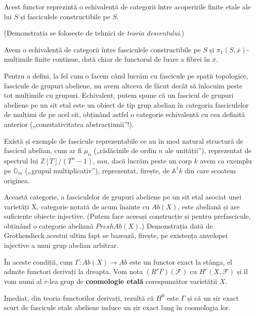 \documentclass[13pt,openany,oneside]{book}
\begin{document}
\begin{teo}
Acest functor reprezintă o echivalență de categorii între acoperirile finite etale ale lui $S$ și fasciculele constructibile pe $S$.
\end{teo}

(Demonstrația se folosește de tehnici de {\it teoria descentului}.)

\begin{cor}
Avem o echivalență de categorii între fasciculele constructibile pe $S$ și $\pi_1(S,\bar{x})$-mulțimile finite continue, dată chiar de functorul de luare a fibrei în $\bar{x}$.
\end{cor}

Pentru a defini, la fel cum o facem când lucrăm cu fascicule pe spații topologice, fascicule de grupuri abeliene, nu avem altceva de făcut decât să înlocuim peste tot mulțimile cu grupuri. Echivalent, putem spune că un fascicul de grupuri abeliene pe un sit etal este un obiect de tip grup abelian în categoria fasciculelor de mulțimi de pe acel sit, obținând astfel o categorie echivalentă cu cea definită anterior („comutativitatea abstracțiunii”!).

Există și exemple de fascicule reprezentabile ce au în mod natural structură de fascicul abelian, cum ar fi $\mu_n$ („rădăcinile de ordin $n$ ale unității”), reprezentat de spectrul lui $\mathbb{Z}[T]/(T^n-1)$, sau, dacă lucrăm peste un corp $k$ avem ca exemplu pe $\mathbb{G}_m$ („grupul multiplicativ”), reprezentat, firește, de $\mathbb{A}^1 k$ din care scoatem originea.

Această categorie, a fasciculelor de grupuri abeliene pe un sit etal asociat unei varietăți X, categorie notată de acum înainte cu $Ab(X)$, este abeliană și are suficiente obiecte injective. (Putem face aceeași construcție și pentru prefascicule, obținând o categorie abeliană $PreshAb(X)$.) Demonstrația dată de Grothendieck acestui ultim fapt se bazează, firește, pe existența anvelopei injective a unui grup abelian arbitrar.

În aceste condiții, cum $\Gamma: Ab(X) \rightarrow Ab$ este un functor exact la stânga, el admite functori derivați la dreapta. Vom nota $(R^r\Gamma)(\mathcal{F})$ cu $H^r(X,\mathcal{F})$ și îl vom numi al $r$-lea grup de {\bf coomologie etală} corespunzător varietății $X$.

Imediat, din teoria functorilor derivați, rezultă că $H^0$ este $\Gamma$ și că un șir exact scurt de fascicule etale abeliene induce un șir exact lung în coomologia lor.
\end{document}
